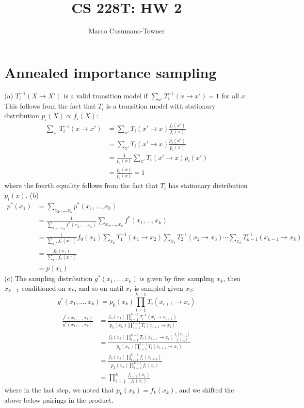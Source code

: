 \documentclass[11pt]{article}
\title{CS 228T: HW 2}
\author{Marco Cusumano-Towner}
\begin{document}
\maketitle
\section{Annealed importance sampling}
(a) $T^{-1}_i(X \to X')$ is a valid transition model if $\sum_{x'} T^{-1}_i(x \to x') = 1$ for all $x$. This follows from the fact that $T_i$ is a transition model with stationary distribution $p_i(X) \propto f_i(X)$:
\begin{align*}
  \sum_{x'} T_i^{-1}(x \to x') &= \sum_{x'} T_i(x' \to x) \frac{f_i(x')}{f_i(x)}\\
  &= \sum_{x'} T_i(x' \to x) \frac{p_i(x')}{p_i(x)}\\
  &= \frac{1}{p_i(x)} \sum_{x'} T_i(x' \to x) p_i(x')\\
  &= \frac{p_i(x)}{p_i(x)} = 1
\end{align*}
where the fourth equality follows from the fact that $T_i$ has stationary distribution $p_i(x)$. %
(b) 
\begin{align*}
  p^*(x_1) &= \sum_{x_2,\ldots,x_k} p^*(x_1,\ldots,x_k)\\
  &= \frac{1}{\sum_{x_1,\ldots,x_k} f^*(x_1,\ldots,x_k)} \sum_{x_2,\ldots,x_k} f^*(x_1,\ldots,x_k)\\
  &= \frac{1}{\sum_{x_1'} f_0(x_1')} f_0(x_1) \sum_{x_2} T^{-1}_1(x_1 \to x_2) \sum_{x_3} T^{-1}_2(x_2 \to x_3) \cdots \sum_{x_k} T^{-1}_{k-1}(x_{k-1} \to x_k)\\
  &= \frac{f_0(x_1)}{\sum_{x_1'} f_0(x_1')}\\
  &= p(x_1)
\end{align*}
(c) The sampling distribution $g^*(x_1,\ldots,x_k)$ is given by first sampling $x_k$, then $x_{k-1}$ conditioned on $x_k$, and so on until $x_1$ is sampled given $x_2$:
\[ g^*(x_1,\ldots,x_k) = p_k(x_k) \prod_{i=1}^{k-1} T_i(x_{i+1} \to x_i)\]
\begin{align*}
  \frac{f^*(x_1,\ldots,x_k)}{g^*(x_1,\ldots,x_k)} &= \frac{f_0(x_1) \prod_{i=1}^{k-1} T_i^{-1}(x_i \to x_{i+1})}{p_k(x_k) \prod_{i=1}^{k-1} T_i(x_{i+1} \to x_i)} \\
  &= \frac{f_0(x_k) \prod_{i=1}^{k-1} T_i(x_{i+1} \to x_i) \frac{f_i(x_{i+1})}{f_i(x_i)} }{p_k(x_k) \prod_{i=1}^{k-1} T_i(x_{i+1} \to x_i)}\\
  &= \frac{f_0(x_k) \prod_{i=1}^{k-1} f_i(x_{i+1}) }{p_k(x_k) \prod_{i=1}^{k-1} f_i(x_i)}\\
  &= \prod_{i=1}^k \frac{f_{i-1}(x_i)}{f_i(x_i)}
\end{align*}
where in the last step, we noted that $p_k(x_k) = f_k(x_k)$, and we shifted the above-below pairings in the product.
\end{document}
